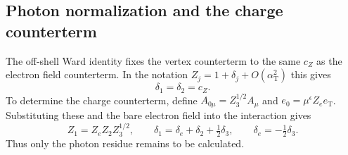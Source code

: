 \subsection{Photon normalization and the charge counterterm}
The off-shell Ward identity fixes the vertex counterterm to the same
$c_Z$ as the electron field counterterm. In the notation
$Z_j=1+\delta_j+O(\alpha_{\mathrm T}^2)$ this gives
\begin{equation}
 \delta_1=\delta_2=c_Z.
\end{equation}
To determine the charge counterterm, define
$A_{0\mu}=Z_3^{1/2}A_\mu$ and
$e_0=\mu^\epsilon Z_e e_{\mathrm T}$. Substituting these and the
bare electron field into the interaction gives
\begin{equation}
 Z_1=Z_e Z_2 Z_3^{1/2},\qquad
 \delta_1=\delta_e+\delta_2+\tfrac12\delta_3,
 \qquad \delta_e=-\tfrac12\delta_3.
\end{equation}
Thus only the photon residue remains to be calculated.

